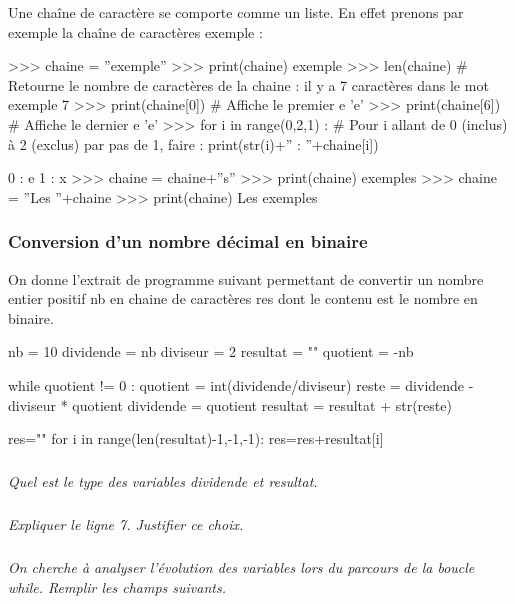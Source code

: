 \documentclass[10pt]{article}
\begin{document}
\begin{py}
Une chaîne de caractère se comporte comme un liste. En effet prenons par exemple la chaîne de caractères \textsf{exemple} :
\begin{python}
>>> chaine = ''exemple''
>>> print(chaine)
        exemple
>>> len(chaine)  # Retourne le nombre de caractères de la chaine : il y a 7 caractères dans le mot exemple
        7
>>> print(chaine[0]) # Affiche le premier e
        'e'
>>> print(chaine[6]) # Affiche le dernier e
        'e'
>>> for i in range(0,2,1) : # Pour i allant de 0 (inclus) à 2 (exclus) par pas de 1, faire : 
            print(str(i)+'' : ''+chaine[i])
            
        0 : e
        1 : x
>>> chaine = chaine+''s''
>>> print(chaine)
        exemples
>>> chaine = ''Les ''+chaine
>>> print(chaine)
        Les exemples
\end{python}
\end{py}

\subsubsection{Conversion d'un nombre décimal en binaire}
On donne l'extrait de programme suivant permettant de convertir un nombre entier positif \textsf{nb} en chaine de caractères \textsf{res} dont le contenu est le nombre en binaire. 


\begin{py}
\begin{minipage}[c]{.5\linewidth}
\begin{python}
nb = 10
dividende = nb
diviseur = 2
resultat = ""
quotient = -nb
    
while quotient != 0 :
    quotient = int(dividende/diviseur)
    reste = dividende - diviseur * quotient
    dividende = quotient
    resultat = resultat + str(reste)
    
res=""
for i in range(len(resultat)-1,-1,-1):
    res=res+resultat[i]
\end{python}
\end{minipage}
\end{py}

\subparagraph{}\textit{Quel est le type des variables \textsf{dividende} et \textsf{resultat}.}

\subparagraph{}\textit{Expliquer le ligne 7. Justifier ce choix.}

\subparagraph{}\textit{On cherche à analyser l'évolution des variables lors du parcours de la boucle \textsf{while}. Remplir les champs suivants.}
\end{document}

